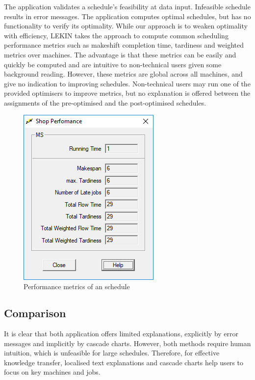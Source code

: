 The application validates a schedule's feasibility at data input. Infeasible schedule results in error messages. The application computes optimal schedules, but has no functionality to verify its optimality. While our approach is to weaken optimality with efficiency, LEKIN takes the approach to compute common scheduling performance metrics such as makeshift completion time, tardiness and weighted metrics over machines. The advantage is that these metrics can be easily and quickly be computed and are intuitive to non-technical users given some background reading. However, these metrics are global across all machines, and give no indication to improving schedules. Non-technical users may run one of the provided optimisers to improve metrics, but no explanation is offered between the assignments of the pre-optimised and the post-optimised schedules.

\begin{figure}[H]
	\begin{center}
		\includegraphics[scale=0.8]{figures/lekinmetric.png}
	\end{center}
	\caption{Performance metrics of an schedule}
\end{figure}

\subsection{Comparison}

It is clear that both application offers limited explanations, explicitly by error messages and implicitly by cascade charts. However, both methods require human intuition, which is unfeasible for large schedules. Therefore, for effective knowledge transfer, localised text explanations and cascade charts help users to focus on key machines and jobs.